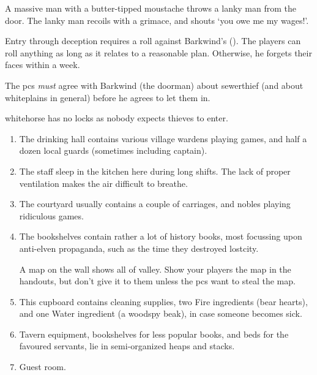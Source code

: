 \begin{multicols}{2}
\begin{boxtext}
  A massive man with a butter-tipped moustache throws a lanky man from the door.
  The lanky man recoils with a grimace, and shouts `you owe me my wages!'.
\end{boxtext}


Entry through deception requires a roll against Barkwind's  (\tn).
The players can roll anything as long as it relates to a reasonable plan.
Otherwise, he forgets their faces within a week.

The \glspl{pc} \emph{must} agree with Barkwind (the doorman) about \gls{sewerthief} (and about \gls{whiteplains} in general) before he agrees to let them in.

\Gls{whitehorse} has no locks as nobody expects thieves to enter.
 
\begin{enumerate}
  \item
  The drinking hall contains various \gls{village} \glspl{warden} playing games, and half a dozen local guards (sometimes including \gls{captain}).
  \label{horseHall}
  \item
  \label{horseKitch}
  The staff sleep in the kitchen here during long shifts.
  The lack of proper ventilation makes the air difficult to breathe.
  \item
  \label{horseYard}
  The courtyard usually contains a couple of carriages, and nobles playing ridiculous games.
  \item
  \label{horseUpstairs}
  The bookshelves contain rather a lot of history books, most focussing upon anti-elven propaganda, such as the time they destroyed \gls{lostcity}.

  A map on the wall shows all of \gls{valley}.
  Show your players the map in the handouts, but don't give it to them unless the \glspl{pc} want to steal the map.
  \item
  \label{horseCupboard}
  This cupboard contains cleaning supplies, two Fire \glspl{ingredient} (bear hearts), and one Water \gls{ingredient} (a woodspy beak), in case someone becomes sick.
  \item
  \label{horseSideRoom}
  Tavern equipment, bookshelves for less popular books, and beds for the favoured servants, lie in semi-organized heaps and stacks.
  \item
  \label{wolfRoom}
  Guest room.
\end{enumerate}


\end{multicols}
